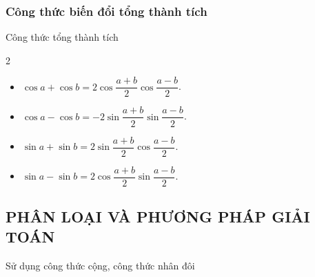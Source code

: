 \subsubsection{Công thức biến đổi tổng thành tích}
\begin{khung4}{Công thức tổng thành tích}
	\begin{multicols}{2}
		\begin{itemize}
			\item $\cos a+ \cos b = 2\cos\dfrac{a+b}{2}\cos \dfrac{a-b}{2}$.
			\item $\cos a- \cos b = -2\sin\dfrac{a+b}{2}\sin \dfrac{a-b}{2}$.
			\item $\sin a+ \sin b = 2\sin\dfrac{a+b}{2}\cos \dfrac{a-b}{2}$.
			\item $\sin a -\sin b = 2\cos\dfrac{a+b}{2}\sin \dfrac{a-b}{2}$.
		\end{itemize}
	\end{multicols}
\end{khung4}
\subsection{PHÂN LOẠI VÀ PHƯƠNG PHÁP GIẢI TOÁN}
\begin{dang}{Sử dụng công thức cộng, công thức nhân đôi}
\end{dang}

